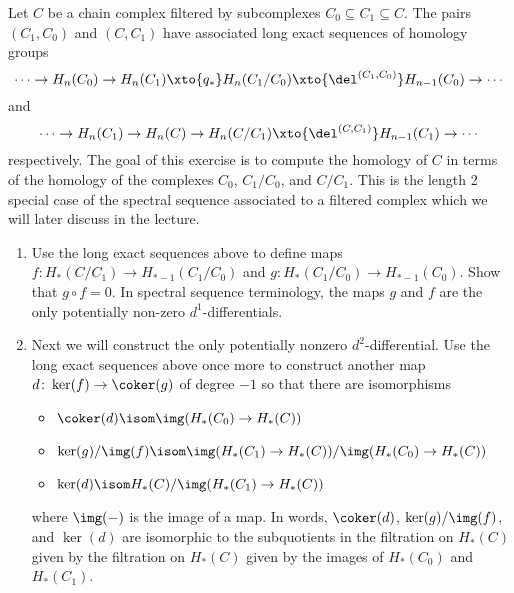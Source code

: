 \documentclass[wip, topology]{bsteffan-lecturenotes}
\begin{document}
\begin{exercise}
	Let $C$ be a chain complex filtered by subcomplexes $C_0 \subseteq C_1 \subseteq C$.
	The pairs $(C_1, C_0)$ and $(C, C_1)$ have associated long exact sequences of homology groups
	\begin{equation}\label{ex2:les1}
		\cdots \to H_n(C_0) \to H_n(C_1) \xto{q_*} H_n(C_1 / C_0) \xto{\del^{(C_1, C_0)}} H_{n - 1}(C_0) \to \cdots
	\end{equation}
	and 
	\begin{equation}\label{ex2:les2}
		\cdots \to H_n(C_1) \to H_n(C) \to H_n(C / C_1) \xto{\del^{(C, C_1)}} H_{n - 1}(C_1) \to \cdots
	\end{equation}
	respectively.
	The goal of this exercise is to compute the homology of $C$ in terms of the homology of the complexes $C_0$, $C_1 / C_0$, and $C / C_1$.
	This is the length 2 special case of the spectral sequence associated to a filtered complex which we will later discuss in the lecture.
	\begin{enumerate}
		\item Use the long exact sequences above to define maps $f\colon H_*(C / C_1) \to H_{* - 1}(C_1 / C_0)$ and $g\colon H_*(C_1 / C_0) \to H_{* - 1}(C_0)$.
			Show that $g \circ f = 0$.
			In spectral sequence terminology, the maps $g$ and $f$ are the only potentially non-zero $d^1$-differentials.
		\item Next we will construct the only potentially nonzero $d^2$-differential.
			Use the long exact sequences above once more to construct another map $d\colon \ker(f) \to \coker(g)$ of degree $-1$ so that there are isomorphisms
			\begin{itemize}
				\item $\coker(d) \isom \img(H_*(C_0) \to H_*(C))$
				\item $\ker(g) / \img(f) \isom \img(H_*(C_1) \to H_*(C)) / \img(H_*(C_0) \to H_*(C))$
				\item $\ker(d) \isom H_*(C) / \img(H_*(C_1) \to H_*(C))$
			\end{itemize}
			where $\img({{-}})$ is the image of a map.
			In words, $\coker(d)$, $\ker(g) / \img(f)$, and $\ker(d)$ are isomorphic to the subquotients in the filtration on $H_*(C)$ given by the filtration on $H_*(C)$ given by the images of $H_*(C_0)$ and $H_*(C_1)$.
	\end{enumerate}
\end{exercise}
\end{document}
